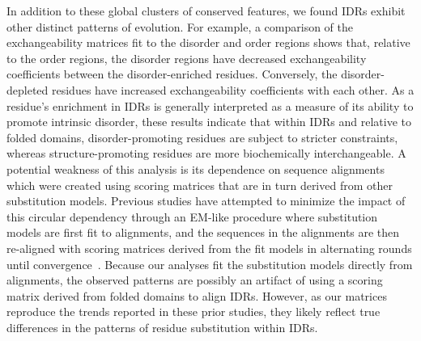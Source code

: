 In addition to these global clusters of conserved features, we found IDRs exhibit other distinct patterns of evolution. For example, a comparison of the exchangeability matrices fit to the disorder and order regions shows that, relative to the order regions, the disorder regions have decreased exchangeability coefficients between the disorder-enriched residues. Conversely, the disorder-depleted residues have increased exchangeability coefficients with each other. As a residue's enrichment in IDRs is generally interpreted as a measure of its ability to promote intrinsic disorder, these results indicate that within IDRs and relative to folded domains, disorder-promoting residues are subject to stricter constraints, whereas structure-promoting residues are more biochemically interchangeable. A potential weakness of this analysis is its dependence on sequence alignments which were created using scoring matrices that are in turn derived from other substitution models. Previous studies have attempted to minimize the impact of this circular dependency through an EM-like procedure where substitution models are first fit to alignments, and the sequences in the alignments are then re-aligned with scoring matrices derived from the fit models in alternating rounds until convergence~\cite{Brown2009, Szalkowski2011}. Because our analyses fit the substitution models directly from alignments, the observed patterns are possibly an artifact of using a scoring matrix derived from folded domains to align IDRs. However, as our matrices reproduce the trends reported in these prior studies, they likely reflect true differences in the patterns of residue substitution within IDRs.

